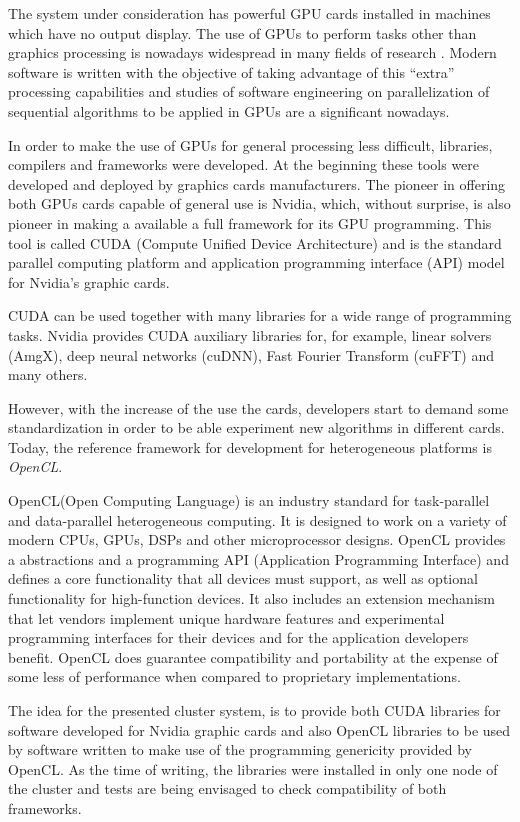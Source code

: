 \documentclass[twoside,a4paper,12pt,english]{inac17}
\begin{document}
The system under consideration has powerful GPU cards installed in machines
which have no output display. The use of GPUs to perform tasks other than graphics processing
is nowadays widespread in many fields of research \cite{gpgpu}. Modern software is written with
the objective of taking advantage of this ``extra'' processing capabilities and studies of software
engineering on parallelization of sequential algorithms to be applied in GPUs are a significant
nowadays.

In order to make the use of GPUs for general processing less difficult, libraries, compilers and
frameworks were developed. At the beginning these tools were developed and deployed by graphics cards
manufacturers. The pioneer in offering both GPUs cards capable of general use is Nvidia, which,
without surprise, is also pioneer in making a available a full framework for its GPU programming.
This tool is called CUDA (Compute Unified Device Architecture) and is the standard parallel computing platform
and application programming interface (API) model for Nvidia's graphic cards.

CUDA can be used together with many libraries for a wide range of programming tasks. Nvidia provides CUDA
auxiliary libraries for, for example, linear solvers (AmgX), deep neural networks (cuDNN), Fast Fourier Transform (cuFFT) and
many others. 

However, with the increase of the use the cards, developers start to demand some
standardization in order to be able experiment new algorithms in different cards. Today, the
reference framework for development for heterogeneous platforms is \textit{OpenCL}\cite{opencl}.

OpenCL\texttrademark (Open Computing Language) is an industry standard for task-parallel and
data-parallel heterogeneous computing. It is designed to work on a variety of modern
CPUs, GPUs, DSPs and other microprocessor designs. OpenCL provides a abstractions and a
programming API (Application Programming Interface) and defines a core functionality that all
devices must support, as well as optional functionality for high-function devices. It also
includes an extension mechanism that let vendors implement unique hardware features and
experimental programming interfaces for their devices and for the application developers
benefit. OpenCL does guarantee compatibility and portability at the expense of some less
of performance when compared to proprietary implementations.

The idea for the presented cluster system, is to provide both CUDA libraries for
software developed for Nvidia graphic cards and also OpenCL libraries to
be used by software written to make use of the programming genericity
provided by OpenCL. As the time of writing, the libraries were installed
in only one node of the cluster and tests are being envisaged to check
compatibility of both frameworks.
\end{document}
